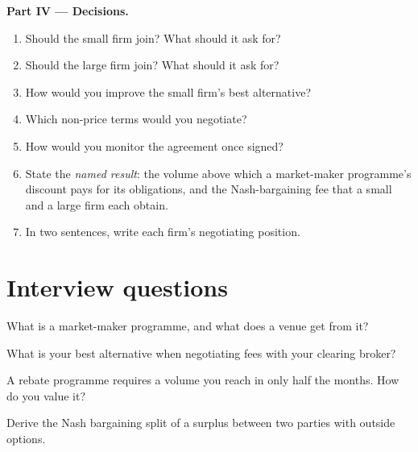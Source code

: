 \begin{problem}
\medskip\noindent\textbf{Part IV --- Decisions.}
\begin{enumerate}[resume]
\item Should the small firm join? What should it ask for?
\item Should the large firm join? What should it ask for?
\item How would you improve the small firm's best alternative?
\item Which non-price terms would you negotiate?
\item How would you monitor the agreement once signed?
\item State the \emph{named result}: the volume above which a market-maker programme's discount pays for its obligations, and the Nash-bargaining
fee that a small and a large firm each obtain.
\item In two sentences, write each firm's negotiating position.
\end{enumerate}
\end{problem}

\section{Interview questions}

\begin{interviewq}\label{iq:fm:commercial-relationships-with-venues-brokers-and-vendors:1}
What is a market-maker programme, and what does a venue get from it?
\end{interviewq}

\begin{interviewq}\label{iq:fm:commercial-relationships-with-venues-brokers-and-vendors:2}
What is your best alternative when negotiating fees with your clearing broker?
\end{interviewq}

\begin{interviewq}\label{iq:fm:commercial-relationships-with-venues-brokers-and-vendors:3}
A rebate programme requires a volume you reach in only half the months. How do you value it?
\end{interviewq}

\begin{interviewq}\label{iq:fm:commercial-relationships-with-venues-brokers-and-vendors:4}
Derive the Nash bargaining split of a surplus between two parties with outside options.
\end{interviewq}

